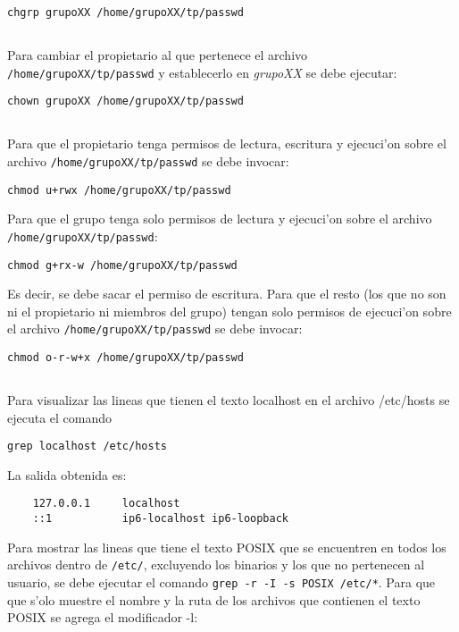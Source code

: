 \texttt{chgrp grupoXX /home/grupoXX/tp/passwd}

\subsection{}
Para cambiar el propietario al que pertenece el archivo \texttt{/home/grupoXX/tp/passwd} y establecerlo en \emph{grupoXX} se debe ejecutar:

\texttt{chown grupoXX /home/grupoXX/tp/passwd}

\subsection{}
Para que el propietario tenga permisos de lectura, escritura y ejecuci'on sobre el archivo \texttt{/home/grupoXX/tp/passwd} se debe invocar:

\texttt{chmod u+rwx /home/grupoXX/tp/passwd}

Para que el grupo tenga solo permisos de lectura y ejecuci'on sobre el archivo \texttt{/home/grupoXX/tp/passwd}:

\texttt{chmod g+rx-w /home/grupoXX/tp/passwd}

Es decir, se debe sacar el permiso de escritura.
Para que el resto (los que no son ni el propietario ni miembros del grupo) tengan solo permisos de ejecuci'on sobre el archivo \texttt{/home/grupoXX/tp/passwd} se debe invocar:

\texttt{chmod o-r-w+x /home/grupoXX/tp/passwd}

\subsection{}
Para visualizar las lineas que tienen el texto localhost en el archivo /etc/hosts se ejecuta el comando

\texttt{grep localhost /etc/hosts}

La salida obtenida es:
      \begin{mylisting}
      \begin{verbatim}
	127.0.0.1     localhost
	::1           ip6-localhost ip6-loopback
      \end{verbatim}
      \end{mylisting}
Para mostrar las lineas que tiene el texto POSIX que se encuentren en todos los archivos dentro de \texttt{/etc/}, excluyendo los binarios y los que no pertenecen al usuario, se debe ejecutar el comando \texttt{grep -r -I -s POSIX /etc/*}.
Para que que s'olo muestre el nombre y la ruta de los archivos que contienen el texto POSIX se agrega el modificador -l:

